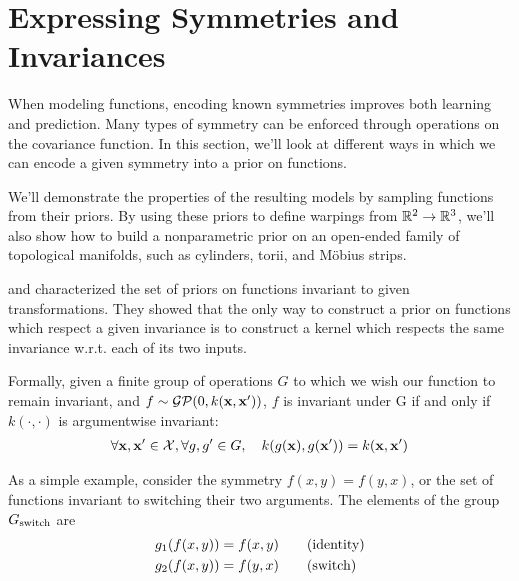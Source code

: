 \section{Expressing Symmetries and Invariances}

When modeling functions, encoding known symmetries improves both learning and prediction. 
Many types of symmetry can be enforced through operations on the covariance function.
In this section, we'll look at different ways in which we can encode a given symmetry into a prior on functions.

We'll demonstrate the properties of the resulting models by sampling functions from their priors.
By using these priors to define warpings from $\mathbb{R}^2 \to \mathbb{R}^3$, we'll also show how to build a nonparametric prior on an open-ended family of topological manifolds, such as cylinders, torii, and M\"{o}bius strips.


\citet{ginsbourger2012argumentwise} and \citet{Invariances13} characterized the set of \gp{} priors on functions invariant to given transformations.
They showed that the only way to construct a prior on functions which respect a given invariance is to construct a kernel which respects the same invariance w.r.t. each of its two inputs.

Formally, given a finite group of operations $G$ to which we wish our function to remain invariant, and $f \sim \mathcal{GP}\!\left(0,k({\bf{x}},{\bf{x}}')\right)$, $f$ is invariant under G if and only if $k(\cdot, \cdot)$ is argumentwise invariant:
%
\begin{align}
\forall {\bf{x}}, {\bf{x}}' \in \mathcal{X}, \forall g, g' \in G, \quad k( g({\bf{x}}), g({\bf{x}}')) = k({\bf{x}}, {\bf{x}}')
\end{align}

\def\gswitch{G_\textnormal{switch}}

As a simple example, consider the symmetry $f(x, y) = f(y,x)$, or the set of functions invariant to switching their two arguments.
The elements of the group $\gswitch$ are
%
\begin{align}
g_1(f(x,y)) & = f(x,y) \qquad \textnormal{(identity)}\\
g_2(f(x,y)) & = f(y,x) \qquad \textnormal{(switch)}
\end{align}

